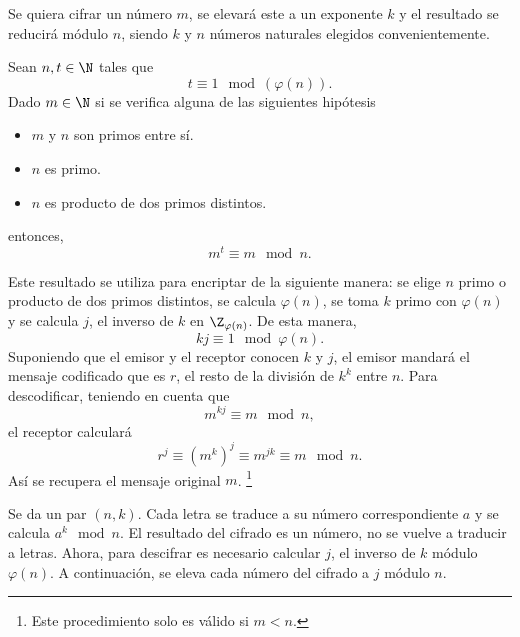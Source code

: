 \begin{fdefinition}
\normalfont  Se quiera cifrar un número $\displaystyle m $, se elevará este a un exponente $\displaystyle k $ y el resultado se reducirá módulo $\displaystyle n $, siendo $\displaystyle k $ y $\displaystyle n $ números naturales elegidos convenientemente. 
\end{fdefinition}

\begin{ftheorem}[]
\normalfont Sean $\displaystyle n, t \in \N $ tales que 
\[t \equiv 1 \mod \left(\varphi\left(n\right)\right) .\]
Dado $\displaystyle m \in \N $ si se verifica alguna de las siguientes hipótesis 
\begin{itemize}
\item $\displaystyle m $ y $\displaystyle n $  son primos entre sí.
\item $\displaystyle n $ es primo. 
\item $\displaystyle n $ es producto de dos primos distintos.
\end{itemize}
entonces, 
\[m^{t} \equiv m \mod n .\]
\end{ftheorem}

\begin{observation}
\normalfont Este resultado se utiliza para encriptar de la siguiente manera: se elige $\displaystyle n $ primo o producto de dos primos distintos, se calcula $\displaystyle \varphi\left(n\right) $, se toma $\displaystyle k $ primo con $\displaystyle \varphi\left(n\right) $ y se calcula $\displaystyle j $, el inverso de $\displaystyle k $ en $\displaystyle \Z_{\varphi\left(n\right)} $. De esta manera, 
\[kj \equiv 1 \mod \varphi\left(n\right) .\]
Suponiendo que el emisor y el receptor conocen $\displaystyle k $ y $\displaystyle j $, el emisor mandará el mensaje codificado que es $\displaystyle r $, el resto de la división de $\displaystyle k^{k} $ entre $\displaystyle n $. Para descodificar, teniendo en cuenta que 
\[m^{kj} \equiv m \mod n ,\]
el receptor calculará
\[r^{j} \equiv \left(m^{k}\right)^{j} \equiv m^{jk} \equiv m \mod n .\]
Así se recupera el mensaje original $\displaystyle m $.
\footnote{Este procedimiento solo es válido si $\displaystyle m < n $.} 
\end{observation}

\begin{fdefinition}
\normalfont Se da un par $\displaystyle \left(n, k\right) $. Cada letra se traduce a su número correspondiente $\displaystyle a $ y se calcula $\displaystyle a^{k} \mod n $. El resultado del cifrado es un número, no se vuelve a traducir a letras. Ahora, para descifrar es necesario calcular $\displaystyle j $, el inverso de $\displaystyle k $ módulo $\displaystyle \varphi\left(n\right) $. A continuación, se eleva cada número del cifrado a $\displaystyle j $ módulo $\displaystyle n $.
\end{fdefinition}

